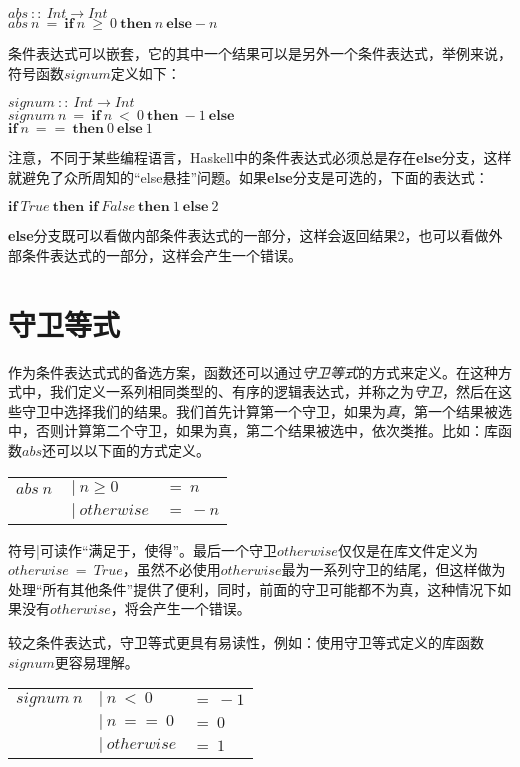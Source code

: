 \noindent\hspace*{1cm}$abs~::~Int \rightarrow Int$\\
\hspace*{1cm}$abs~n~=~\textbf{if}~n~ \geq ~0~ \textbf{then}~n~ \textbf{else} -n $

条件表达式可以嵌套，它的其中一个结果可以是另外一个条件表达式，举例来说，符号函数$signum$定义如下：

\noindent\hspace*{1cm}$signum~::~Int \rightarrow Int$\\
\hspace*{1cm}$signum~n~=~\textbf{if}~n~<~0~\textbf{then}~-1~\textbf{else} $\\
\hspace*{4cm}$\textbf{if}~n~==~\textbf{then}~0~\textbf{else}~1$

注意，不同于某些编程语言，Haskell中的条件表达式必须总是存在{\bf{else}}分支，这样就避免了众所周知的“else悬挂”问题。如果\textbf{else}分支是可选的，下面的表达式：

$\textbf{if}~True~\textbf{then~if}~False~\textbf{then}~1~\textbf{else}~2$

\textbf{else}分支既可以看做内部条件表达式的一部分，这样会返回结果2，也可以看做外部条件表达式的一部分，这样会产生一个错误。
\section{守卫等式}
作为条件表达式式的备选方案，函数还可以通过\textit{守卫等式}的方式来定义。在这种方式中，我们定义一系列相同类型的、有序的逻辑表达式，并称之为\textit{守卫}，然后在这些守卫中选择我们的结果。我们首先计算第一个守卫，如果为\textit{真}，第一个结果被选中，否则计算第二个守卫，如果为真，第二个结果被选中，依次类推。比如：库函数$abs$还可以以下面的方式定义。

\begin{tabular}[t]{lll}
$abs~n~$&$|~n\geq 0$&$= ~ n$\\
&$|~otherwise$&$=~-n$\\
\end{tabular}

符号|可读作“满足于，使得”。最后一个守卫$otherwise$仅仅是在库文件定义为$otherwise~=~True$，虽然不必使用$otherwise$最为一系列守卫的结尾，但这样做为处理“所有其他条件”提供了便利，同时，前面的守卫可能都不为真，这种情况下如果没有$otherwise$，将会产生一个错误。

较之条件表达式，守卫等式更具有易读性，例如：使用守卫等式定义的库函数$signum$更容易理解。


\begin{tabular}[t]{lll}
$signum~n$&$|~n~<~0$&$=~-1$\\
&$|~n~==~0$&$=~0$\\
&$|~otherwise$&$=~1$\\
\end{tabular}


